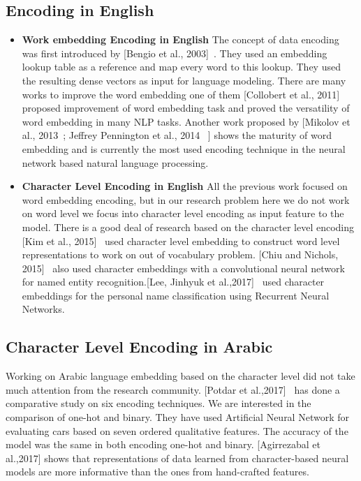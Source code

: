 \subsection{Encoding in English}


\begin{itemize}
\item \textbf{Work embedding Encoding in English} The concept of data encoding was first introduced by [Bengio et al., 2003]~\cite{Bengio2003}. They used an embedding lookup table as a reference and map every word to this lookup. They used the resulting dense vectors as input for language modeling. There are many works to improve the word embedding one of them [Collobert et al., 2011]~\cite{Collobert_2011} proposed improvement of word embedding task and proved the versatility of word embedding in many NLP tasks. Another work proposed by [Mikolov et al., 2013~\cite{Mikolov_2013};
Jeffrey Pennington et al., 2014~\cite{Pennington_2014} ] shows the maturity of word embedding and is currently the most used encoding technique in the neural network based natural language processing.

\item \textbf{Character Level Encoding in English} 
All the previous work focused on word embedding encoding, but in our research problem here we do not work on word level we focus into character level encoding as input feature to the model. There is a good deal of research based on the character level encoding [Kim et al., 2015]~\cite{Kim_2015} used character level embedding to construct word level representations to work on out of vocabulary problem. [Chiu and Nichols, 2015]~\cite{Chiu_2015} also used character embeddings with a convolutional neural network for named entity recognition.[Lee, Jinhyuk et al.,2017]~\cite{ijcai_2017} used character embeddings for the personal name classification using Recurrent Neural Networks.

\end{itemize}

\subsection{Character Level Encoding in Arabic}\label{sec:char-level-arabic}

Working on Arabic language embedding based on the character level did not take much attention from the research community. [Potdar et al.,2017]~\cite{Potdar_2017} has done a comparative study on six encoding techniques. We are interested in the comparison of one-hot and binary. They have used Artificial Neural Network for evaluating cars based on seven ordered qualitative features. The accuracy of the model was the same in both encoding one-hot and binary. [Agirrezabal et al.,2017]\cite{Agirrezabal_2017} shows that representations of data learned from character-based neural models are more informative than the ones from hand-crafted features.

